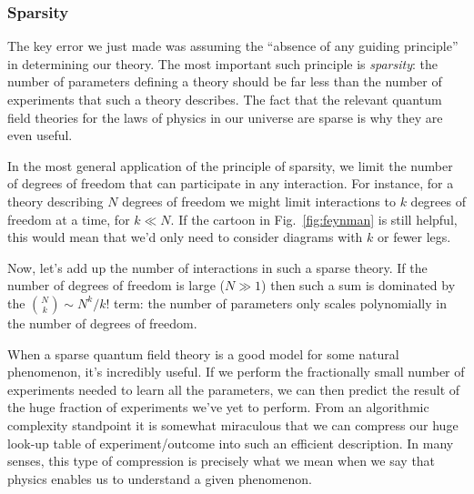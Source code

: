 \documentclass[12pt]{article}
\begin{document}
\subsubsection*{Sparsity}

The key error we just made was assuming the ``absence of any guiding principle'' in determining our theory. The most important such principle is \emph{sparsity}: the number of parameters defining a theory should be far less than the number of experiments that such a theory describes. The fact that the relevant quantum field theories for the laws of physics in our universe are sparse is why they are even useful.

In the most general application of the principle of sparsity, we limit the number of degrees of freedom that can participate in any interaction. For instance, for a theory describing $N$ degrees of freedom we might limit interactions to $k$ degrees of freedom at a time, for $k \ll N$. If the cartoon in Fig.~\ref{fig:feynman} is still helpful, this would mean that we'd only need to consider diagrams with $k$ or fewer legs.

Now, let's add up the number of interactions in such a sparse theory. If the number of degrees of freedom is large ($N \gg 1$) then such a sum is dominated by the $\binom{N}{k}\sim N^k/k!$  term: the number of parameters only scales polynomially in the number of degrees of freedom.

When a sparse quantum field theory is a good model for some natural phenomenon, it's incredibly useful. If we perform the fractionally small number of experiments needed to learn all the parameters, we can then predict the result of the huge fraction of experiments we've yet to perform. From an algorithmic complexity standpoint it is somewhat miraculous that we can compress our huge look-up table of experiment/outcome into such an efficient description. 
In many senses, this type of compression is precisely what we mean when 
we say that physics enables us to understand a given phenomenon.
\end{document}
